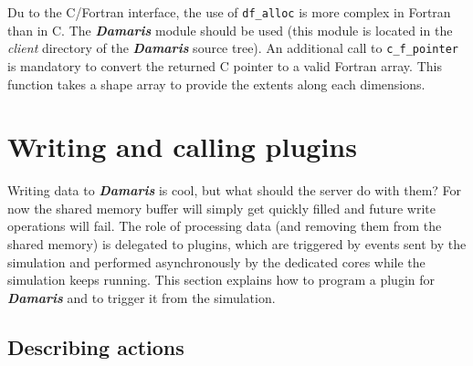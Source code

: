 \documentclass[11pt]{report}
\newcommand{\Damaris}{\emph{\textbf{Damaris}}}
\newcommand{\file}[1]{\emph{#1}}
\newcommand{\function}[1]{\texttt{#1}}
\begin{document}
Du to the C/Fortran interface, the use of \function{df\_alloc} is more complex in Fortran than in C.
The \Damaris{} module should be used (this module is located in the \file{client} directory of the \Damaris{}
source tree). An additional call to \function{c\_f\_pointer} is mandatory to convert the returned C pointer
to a valid Fortran array. This function takes a shape array to provide the extents along each dimensions.



\chapter{Writing and calling plugins}

Writing data to \Damaris{} is cool, but what should the server do with them? For now the shared memory
buffer will simply get quickly filled and future write operations will fail. The role of processing data
(and removing them from the shared memory) is delegated to plugins, which are triggered by events
sent by the simulation and performed asynchronously by the dedicated cores while the simulation keeps running.
This section explains how to program a plugin for \Damaris{} and to trigger it from the simulation.

\section{Describing actions}
\end{document}
